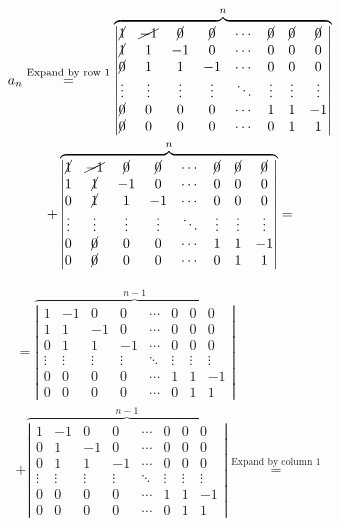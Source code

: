 \documentclass{article}
\begin{document}
\begin{multline*}
a_{n} \overset{\textrm{Expand by row 1}}{=} \overbrace{\left|\begin{matrix} \cancel{1} & \cancel{-1} & \cancel{0} & \cancel{0} & \cdots & \cancel{0} & \cancel{0} & \cancel{0} \\ \cancel{1} & 1 & -1 & 0 & \cdots & 0 & 0 & 0 \\ \cancel{0} & 1 & 1 & -1 & \cdots & 0 & 0 & 0 \\ \vdots & \vdots & \vdots & \vdots & \ddots & \vdots & \vdots & \vdots \\ \cancel{0} & 0 & 0 & 0 & \cdots & 1 & 1 & -1 \\ \cancel{0} & 0 & 0 & 0 & \cdots & 0 & 1 & 1\end{matrix}\right|}^{n} \\
+ \overbrace{\left|\begin{matrix}\cancel{1} & \cancel{-1} & \cancel{0} & \cancel{0} & \cdots & \cancel{0} & \cancel{0} & \cancel{0} \\ 1 & \cancel{1} & -1 & 0 & \cdots & 0 & 0 & 0 \\ 0 & \cancel{1} & 1 & -1 & \cdots & 0 & 0 & 0 \\ \vdots & \vdots & \vdots & \vdots & \ddots & \vdots & \vdots & \vdots \\ 0 & \cancel{0} & 0 & 0 & \cdots & 1 & 1 & -1 \\ 0 & \cancel{0} & 0 & 0 & \cdots & 0 & 1 & 1\end{matrix}\right|}^{n} =
\end{multline*}

\begin{multline*}
= \overbrace{\left|\begin{matrix}1 & -1 & 0 & 0 & \cdots & 0 & 0 & 0 \\ 1 & 1 & -1 & 0 & \cdots & 0 & 0 & 0 \\ 0 & 1 & 1 & -1 & \cdots & 0 & 0 & 0 \\ \vdots & \vdots & \vdots & \vdots & \ddots & \vdots & \vdots & \vdots \\ 0 & 0 & 0 & 0 & \cdots & 1 & 1 & -1 \\ 0 & 0 & 0 & 0 & \cdots & 0 & 1 & 1\end{matrix}\right|}^{n-1} \\
+ \overbrace{\left|\begin{matrix}1 & -1 & 0 & 0 & \cdots & 0 & 0 & 0 \\ 0 & 1 & -1 & 0 & \cdots & 0 & 0 & 0 \\ 0 & 1 & 1 & -1 & \cdots & 0 & 0 & 0 \\ \vdots & \vdots & \vdots & \vdots & \ddots & \vdots & \vdots & \vdots \\ 0 & 0 & 0 & 0 & \cdots & 1 & 1 & -1 \\ 0 & 0 & 0 & 0 & \cdots & 0 & 1 & 1\end{matrix}\right|}^{n-1} \overset{\textrm{Expand by column 1}}{=}
\end{multline*}
\end{document}
